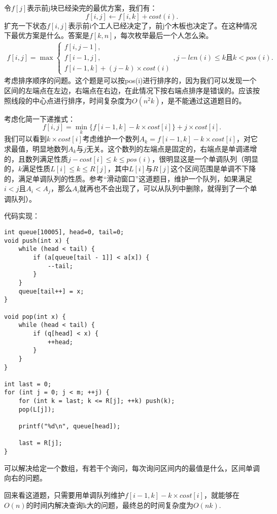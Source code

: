 \documentclass{article}
\begin{document}
令$f[j]$表示前j块已经染完的最优方案，我们有：
\begin{equation*}
    f[i,j]\leftarrow f[i,k]+cost(i).
\end{equation*}
扩充一下状态$f[i,j]$表示前i个工人已经决定了，前j个木板也决定了。在这种情况下最优方案是什么。答案是$f[k,n]$，每次枚举最后一个人怎么染。
\begin{equation*}
    \begin{aligned}
        f[i,j]=\max
        \begin{cases}
            f[i,j-1],\\
            f[i-1,j],\\
            f[i-1,k]+(j-k)\times cost(i)
        \end{cases}
        ,j-len(i)\le k且k<pos(i).
    \end{aligned}
\end{equation*}
考虑排序顺序的问题。这个题是可以按pos(i)进行排序的，因为我们可以发现一个区间的左端点在左边，右端点在右边，在此情况下按右端点排序是错误的。应该按照线段的中心点进行排序，时间复杂度为$O(n^2k)$，是不能通过这道题目的。

考虑化简一下递推式：
\begin{equation*}
    f[i,j]=\min\limits_k\{f[i-1,k]-k\times cost[i]\}+j\times cost[i].
\end{equation*}
我们可以看到$k\times cost[i]$考虑维护一个数列$A_k=f[i-1,k]-k\times cost[i]$，对它求最值，明显地数列$A_k$与$j$无关。这个数列的左端点是固定的，右端点是单调递增的，且数列满足性质$j-cost[i]\le k\le pos(i)$，很明显这是一个单调队列（明显的，$k$满足性质$L[i]\le k\le R[j]$，其中$L[i]$与$R[j]$这个区间范围是单调不下降的，满足单调队列的性质。参考“滑动窗口”这道题目，维护一个队列，如果满足$i<j$且$A_i<A_j$，那么$A_i$就再也不会出现了，可以从队列中删除，就得到了一个单调队列）。

代码实现：
\begin{verbatim}
int queue[10005], head=0, tail=0;
void push(int x) {
    while (head < tail) {
        if (a[queue[tail - 1]] < a[x]) {
            --tail;
        }
    }
    queue[tail++] = x;
}

void pop(int x) {
    while (head < tail) {
        if (q[head] < x) {
            ++head;
        }
    }
}

int last = 0;
for (int j = 0; j < m; ++j) {
    for (int k = last; k <= R[j]; ++k) push(k);
    pop(L[j]);

    printf("%d\n", queue[head]);

    last = R[j];
}
\end{verbatim}

可以解决给定一个数组，有若干个询问，每次询问区间内的最值是什么，区间单调向右的问题。

回来看这道题，只需要用单调队列维护$f[i-1,k]-k\times cost[i]$，就能够在$O(n)$的时间内解决查询k大的问题，最终总的时间复杂度为$O(nk)$.
\end{document}
